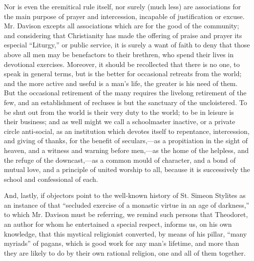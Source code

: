 Nor is even the eremitical rule itself, nor
surely (much less) are associations for the main purpose of prayer and
intercession, incapable of justification or excuse. Mr. Davison
excepts all associations which are for the good of the community; and
considering that Christianity has made the offering of praise and
prayer its especial ``Liturgy,'' or public service, it is surely a want
of faith to deny that those above all men may be benefactors to their
brethren, who spend their lives in devotional exercises. Moreover, it should be recollected that there is no one, to speak
in general terms, but is the better for occasional retreats from the
world; and the more active and useful is a man's life, the greater is
his need of them. But the occasional retirement of the many requires
the livelong retirement of the few, and an establishment of recluses
is but the sanctuary of the uncloistered. To be shut out from the
world is their very duty to the world; to be in leisure is their
business; and as well might we call a schoolmaster inactive, or a
private circle anti-social, as an institution which devotes itself to
repentance, intercession, and giving of thanks, for the benefit of
seculars,—as a propitiation in the sight of heaven, and a witness
and warning before men,—as the home of the helpless, and the refuge
of the downcast,—as a common mould of character, and a bond of
mutual love, and a principle of united worship to all, because it is
successively the school and confessional of each.

And, lastly, if objectors point to the well-known
history of St. Simeon Stylites as an instance of that ``secluded
exercise of a monastic virtue in an age of darkness,'' to which Mr.
Davison must be referring, we remind such persons that Theodoret, an
author for whom he entertained a special respect, informs us, on his
own knowledge, that this mystical religionist converted, by means of
his pillar, ``many myriads'' of pagans, which is good work for any man's
lifetime, and more than they are likely to do by their own rational
religion, one and all of them together.

